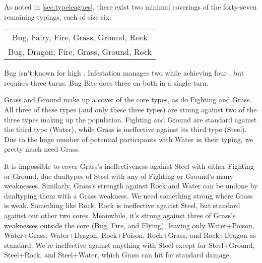As noted in \autoref{sec:typeleagues}, there exist two minimal coverings of the forty-seven
  remaining typings, each of size six:
\begin{center}
\begin{tabular}{c}
 Bug, Fairy, Fire, Grass, Ground, Rock\\
 Bug, Dragon, Fire, Grass, Ground, Rock\\
\end{tabular}
\end{center}
Bug isn't known for high \PPT{}\@. Infestation manages two while achieving four \EPT{},
 but requires three turns. Bug Bite does three on both in a single turn.

Grass and Ground make up a cover of the core types, as do Fighting and Grass.
All three of these types (and only these three types) are strong against two of the three
  types making up the population.
Fighting and Ground are standard against the third type (Water), while Grass is ineffective
  against its third type (Steel).
Due to the huge number of potential participants with Water in their typing, we pretty
  much need Grass.

It is impossible to cover Grass's ineffectiveness against Steel with either Fighting or Ground,
  due dualtypes of Steel with any of Fighting or Ground's many weaknesses.
Similarly, Grass's strength against Rock and Water can be undone by dualtyping them with a Grass weakness.
We need something strong where Grass is weak.
Something like Rock.
Rock is ineffective against Steel, but standard against our other two cores.
Meanwhile, it's strong against three of Grass's weaknesses outside the core (Bug, Fire, and Flying),
  leaving only Water+Poison, Water+Grass, Water+Dragon, Rock+Poison, Rock+Grass, and Rock+Dragon
  as standard.
We're ineffective against anything with Steel except for Steel+Ground, Steel+Rock, and Steel+Water, which
  Grass can hit for standard damage.

